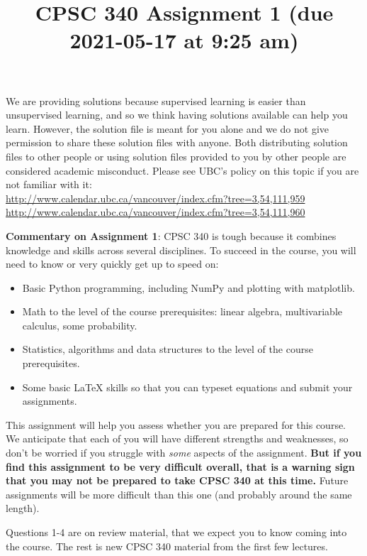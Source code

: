 \documentclass{article}
\def\red#1{{\color{red}#1}}
\begin{document}
	
	\title{CPSC 340 Assignment 1 (due 2021-05-17 at 9:25 am)}
	
	\date{}
	\maketitle
	
	\red{We are providing solutions because supervised learning is easier than unsupervised learning, and so we think having solutions available can help you learn. However, the solution file is meant for you alone and we do not give permission to share these solution files with anyone. Both distributing solution files to other people or using solution files provided to you by other people are considered academic misconduct. Please see UBC's policy on this topic if you are not familiar with it:\\
		\url{http://www.calendar.ubc.ca/vancouver/index.cfm?tree=3,54,111,959}\\
		\url{http://www.calendar.ubc.ca/vancouver/index.cfm?tree=3,54,111,960}}
	
	
	\textbf{Commentary on Assignment 1}: CPSC 340 is tough because it combines knowledge and skills across several disciplines. To succeed
	in the course, you will need to know or very quickly get up to speed on:
	\begin{itemize}
		\item Basic Python programming, including NumPy and plotting with matplotlib.
		\item Math to the level of the course prerequisites: linear algebra, multivariable calculus, some probability.
		\item Statistics, algorithms and data structures to the level of the course prerequisites.
		\item Some basic LaTeX skills so that you can typeset equations and submit your assignments.
	\end{itemize}
	
	This assignment will help you assess whether you are prepared for this course. We anticipate that each
	of you will have different strengths and weaknesses, so don't be worried if you struggle with \emph{some} aspects
	of the assignment. \textbf{But if you find this assignment
		to be very difficult overall, that is a warning sign that you may not be prepared to take CPSC 340
		at this time.} Future assignments will be more difficult than this one (and probably around the same length).
	
	Questions 1-4 are on review material, that we expect you to know coming into the course. The rest is new CPSC 340 material from the first few lectures.
	
\end{document}
